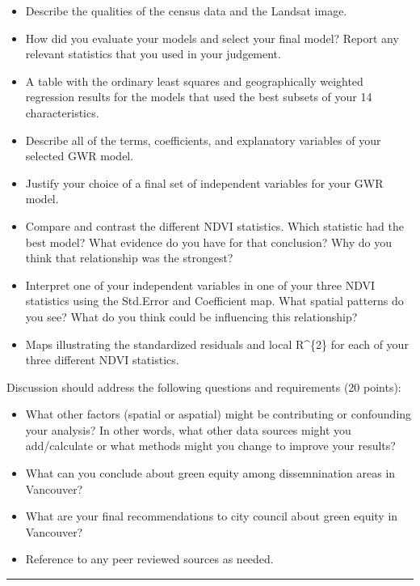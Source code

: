 \documentclass[
]{book}
\begin{document}
\begin{itemize}
\item
  Describe the qualities of the census data and the Landsat image.
\item
  How did you evaluate your models and select your final model? Report any relevant statistics that you used in your judgement.
\item
  A table with the ordinary least squares and geographically weighted regression results for the models that used the best subsets of your 14 characteristics.
\item
  Describe all of the terms, coefficients, and explanatory variables of your selected GWR model.
\item
  Justify your choice of a final set of independent variables for your GWR model.
\item
  Compare and contrast the different NDVI statistics. Which statistic had the best model? What evidence do you have for that conclusion? Why do you think that relationship was the strongest?
\item
  Interpret one of your independent variables in one of your three NDVI statistics using the Std.Error and Coefficient map. What spatial patterns do you see? What do you think could be influencing this relationship?
\item
  Maps illustrating the standardized residuals and local R\^{}\{2\} for each of your three different NDVI statistics.
\end{itemize}

Discussion should address the following questions and requirements (20 points):

\begin{itemize}
\item
  What other factors (spatial or aspatial) might be contributing or confounding your analysis? In other words, what other data sources might you add/calculate or what methods might you change to improve your results?
\item
  What can you conclude about green equity among dissemnination areas in Vancouver?
\item
  What are your final recommendations to city council about green equity in Vancouver?
\item
  Reference to any peer reviewed sources as needed.
\end{itemize}

\begin{center}\rule{0.5\linewidth}{0.5pt}\end{center}
\end{document}
